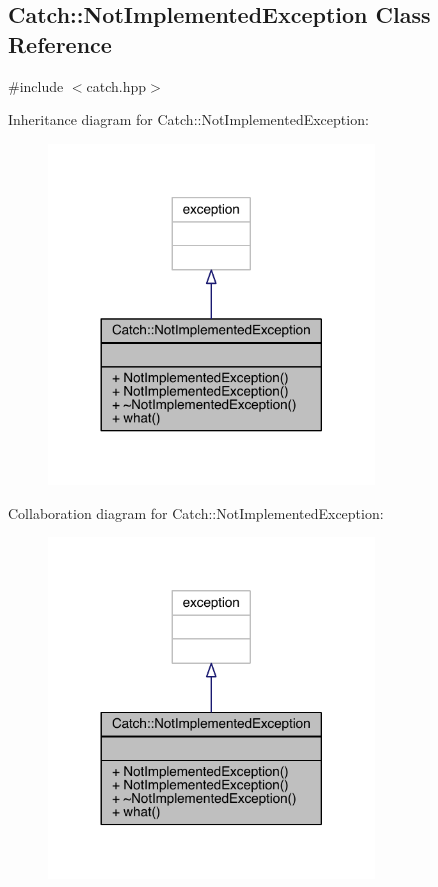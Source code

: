 \hypertarget{a00055}{}\subsection{Catch\+:\+:Not\+Implemented\+Exception Class Reference}
\label{a00055}


{\ttfamily \#include $<$catch.\+hpp$>$}



Inheritance diagram for Catch\+:\+:Not\+Implemented\+Exception\+:\nopagebreak
\begin{figure}[H]
\begin{center}
\leavevmode
\includegraphics[width=245pt]{a00240}
\end{center}
\end{figure}


Collaboration diagram for Catch\+:\+:Not\+Implemented\+Exception\+:\nopagebreak
\begin{figure}[H]
\begin{center}
\leavevmode
\includegraphics[width=245pt]{a00241}
\end{center}
\end{figure}
